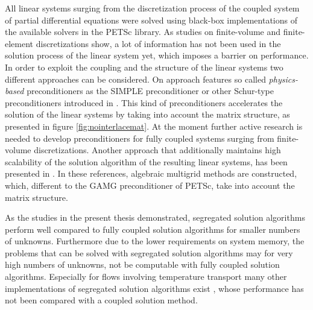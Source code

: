 All linear systems surging from the discretization process of the coupled system of partial differential equations were solved using black-box implementations of the available solvers in the PETSc library. As studies on finite-volume \cite{klaij13,darwish09,mangani14} and finite-element \cite{brown12,elman03,elman08,silvester01,turek02,mcinnes14} discretizations show, a lot of information has not been used in the solution process of the linear system yet, which imposes a barrier on performance. In order to exploit the coupling and the structure of the linear systems two different approaches can be considered. On approach features so called \emph{physics-based} preconditioners as the SIMPLE preconditioner or other Schur-type preconditioners introduced in \cite{klaij13,elman08}. This kind of preconditioners accelerates the solution of the linear systems by taking into account the matrix structure, as presented in figure \ref{fig:nointerlacemat}. At the moment further active research is needed to develop preconditioners for fully coupled systems surging from finite-volume discretizations. Another approach that additionally maintains high scalability of the solution algorithm of the resulting linear systems, has been presented in \cite{darwish09,mangani14}. In these references, algebraic multigrid methods are constructed, which, different to the GAMG preconditioner of PETSc, take into account the matrix structure.

As the studies in the present thesis demonstrated, segregated solution algorithms perform well compared to fully coupled solution algorithms for smaller numbers of unknowns. Furthermore due to the lower requirements on system memory, the problems that can be solved with segregated solution algorithms may for very high numbers of unknowns, not be computable with fully coupled solution algorithms. Especially for flows involving temperature transport many other implementations of segregated solution algorithms exist \cite{liu84,oliveira01}, whose performance has not been compared with a coupled solution method.

